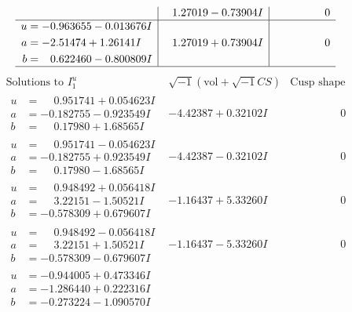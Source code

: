 \documentclass[1p]{elsarticle_modified}
\theoremstyle{definition}
\newcommand{\I}{\sqrt{-1}}
\begin{document}
$$\begin{array}{c|c|c}
 & \phantom{-}1.27019 - 0.73904 I & \phantom{-0.000000 } 0 \\ \hline\begin{aligned}
u &= -0.963655 - 0.013676 I \\
a &= -2.51474 + 1.26141 I \\
b &= \phantom{-}0.622460 - 0.800809 I\end{aligned}
 & \phantom{-}1.27019 + 0.73904 I & \phantom{-0.000000 } 0\\
 \hline 
 \end{array}$$\newpage$$\begin{array}{c|c|c}  
\text{Solutions to }I^u_{1}& \I (\text{vol} + \sqrt{-1}CS) & \text{Cusp shape}\\
 \hline 
\begin{aligned}
u &= \phantom{-}0.951741 + 0.054623 I \\
a &= -0.182755 - 0.923549 I \\
b &= \phantom{-}0.17980 + 1.68565 I\end{aligned}
 & -4.42387 + 0.32102 I & \phantom{-0.000000 } 0 \\ \hline\begin{aligned}
u &= \phantom{-}0.951741 - 0.054623 I \\
a &= -0.182755 + 0.923549 I \\
b &= \phantom{-}0.17980 - 1.68565 I\end{aligned}
 & -4.42387 - 0.32102 I & \phantom{-0.000000 } 0 \\ \hline\begin{aligned}
u &= \phantom{-}0.948492 + 0.056418 I \\
a &= \phantom{-}3.22151 - 1.50521 I \\
b &= -0.578309 + 0.679607 I\end{aligned}
 & -1.16437 + 5.33260 I & \phantom{-0.000000 } 0 \\ \hline\begin{aligned}
u &= \phantom{-}0.948492 - 0.056418 I \\
a &= \phantom{-}3.22151 + 1.50521 I \\
b &= -0.578309 - 0.679607 I\end{aligned}
 & -1.16437 - 5.33260 I & \phantom{-0.000000 } 0 \\ \hline\begin{aligned}
u &= -0.944005 + 0.473346 I \\
a &= -1.286440 + 0.222316 I \\
b &= -0.273224 - 1.090570 I\end{aligned}

\end{array}$$
\end{document}
